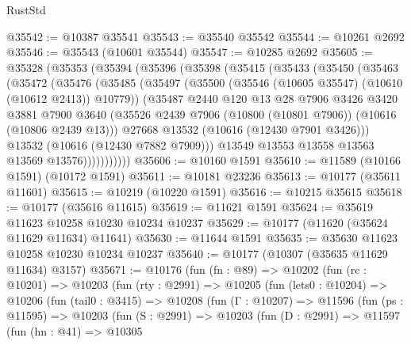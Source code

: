 \begin{lexlean}{RustStd}
\begin{coremodule}
@35542 := @10387 @35541
@35543 := @35540 @35542
@35544 := @10261 @2692
@35546 := @35543 (@10601 @35544)
@35547 := @10285 @2692
@35605 := @35328
    (@35353
      (@35394
        (@35396
          (@35398
            (@35415
              (@35433
                (@35450
                  (@35463
                    (@35472
                      (@35476
                        (@35485
                          (@35497
                            (@35500 (@35546 (@10605 @35547) (@10610 (@10612 @2413)) @10779))
                            (@35487
                              @2440
                              @120
                              @13
                              @28
                              @7906
                              @3426
                              @3420
                              @3881
                              @7900
                              @3640
                              (@35526
                                @2439
                                @7906
                                (@10800 (@10801 @7906))
                                (@10616 (@10806 @2439 @13)))
                              @27668
                              @13532
                              (@10616 (@12430 @7901 @3426)))
                            @13532
                            (@10616 (@12430 @7882 @7909)))
                          @13549
                          @13553
                          @13558
                          @13563
                          @13569
                          @13576)))))))))))
@35606 := @10160 @1591
@35610 := @11589 (@10166 @1591) (@10172 @1591)
@35611 := @10181 @23236
@35613 := @10177 (@35611 @11601)
@35615 := @10219 (@10220 @1591)
@35616 := @10215 @35615
@35618 := @10177 (@35616 @11615)
@35619 := @11621 @1591
@35624 := @35619 @11623 @10258 @10230 @10234 @10237
@35629 := @10177 (@11620 (@35624 @11629 @11634) @11641)
@35630 := @11644 @1591
@35635 := @35630 @11623 @10258 @10230 @10234 @10237
@35640 := @10177 (@10307 (@35635 @11629 @11634) @3157)
@35671 := @10176
    (fun (fn : @89) =>
    @10202
      (fun (rc : @10201) =>
      @10203
        (fun (rty : @2991) =>
        @10205
          (fun (lets0 : @10204) =>
          @10206
            (fun (tail0 : @3415) =>
            @10208
              (fun (Γ : @10207) =>
              @11596
                (fun (ps : @11595) =>
                @10203
                  (fun (S : @2991) =>
                  @10203
                    (fun (D : @2991) =>
                    @11597
                      (fun (hn : @41) =>
                      @10305

\end{coremodule}
\end{lexlean}
